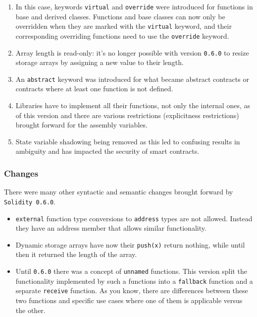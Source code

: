 \begin{enumerate}
\def\labelenumi{\arabic{enumi}.}
\tightlist
\item
  In this case, keywords \texttt{virtual} and \texttt{override} were
  introduced for functions in base and derived classes. Functions and
  base classes can now only be overridden when they are marked with the
  \texttt{virtual} keyword, and their corresponding overriding functions
  need to use the \texttt{override} keyword.
\item
  Array length is read-only: it's no longer possible with version
  \texttt{0.6.0} to resize storage arrays by assigning a new value to
  their length.
\item
  An \texttt{abstract} keyword was introduced for what became abstract
  contracts or contracts where at least one function is not defined.
\item
  Libraries have to implement all their functions, not only the internal
  ones, as of this version and there are various restrictions
  (explicitness restrictions) brought forward for the assembly
  variables.
\item
  State variable shadowing being removed as this led to confusing
  results in ambiguity and has impacted the security of smart contracts.
\end{enumerate}

\subsubsection{Changes}\label{changes}

There were many other syntactic and semantic changes brought forward by
\texttt{Solidity\ 0.6.0}.

\begin{itemize}
\tightlist
\item
  \texttt{external} function type conversions to \texttt{address} types
  are not allowed. Instead they have an address member that allows
  similar functionality.
\item
  Dynamic storage arrays have now their \texttt{push(x)} return nothing,
  while until then it returned the length of the array.
\item
  Until \texttt{0.6.0} there was a concept of \texttt{unnamed}
  functions. This version split the functionality implemented by such a
  functions into a \texttt{fallback} function and a separate
  \texttt{receive} function. As you know, there are differences between
  these two functions and specific use cases where one of them is
  applicable versus the other.
\end{itemize}

